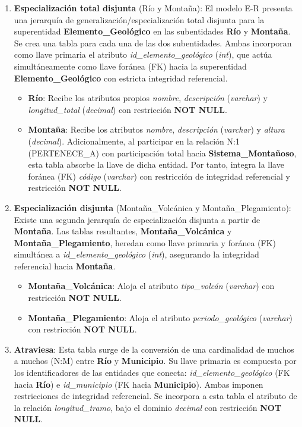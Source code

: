 \begin{enumerate}
\item \textbf{Especialización total disjunta} (Río y Montaña): El modelo E-R presenta una jerarquía de generalización/especialización total disjunta para la superentidad \textbf{Elemento\_Geológico} en las subentidades \textbf{Río} y \textbf{Montaña}. Se crea una tabla para cada una de las dos subentidades. Ambas incorporan como llave primaria el atributo \textit{id\_elemento\_geológico} (\textit{int}), que actúa simultáneamente como llave foránea (FK) hacia la superentidad \textbf{Elemento\_Geológico} con estricta integridad referencial.
\begin{itemize}
    \item \textbf{Río}: Recibe los atributos propios \textit{nombre}, \textit{descripción} (\textit{varchar}) y \textit{longitud\_total} (\textit{decimal}) con restricción \textbf{NOT NULL}.
    \item \textbf{Montaña}: Recibe los atributos \textit{nombre}, \textit{descripción} (\textit{varchar}) y \textit{altura} (\textit{decimal}). Adicionalmente, al participar en la relación N:1 (PERTENECE\_A) con participación total hacia \textbf{Sistema\_Montañoso}, esta tabla absorbe la llave de dicha entidad. Por tanto, integra la llave foránea (FK) \textit{código} (\textit{varchar}) con restricción de integridad referencial y restricción \textbf{NOT NULL}.
\end{itemize}

\item \textbf{Especialización disjunta} (Montaña\_Volcánica y Montaña\_Plegamiento): Existe una segunda jerarquía de especialización disjunta a partir de \textbf{Montaña}. Las tablas resultantes, \textbf{Montaña\_Volcánica} y \textbf{Montaña\_Plegamiento}, heredan como llave primaria y foránea (FK) simultánea a \textit{id\_elemento\_geológico} (\textit{int}), asegurando la integridad referencial hacia \textbf{Montaña}.
\begin{itemize}
    \item \textbf{Montaña\_Volcánica}: Aloja el atributo \textit{tipo\_volcán} (\textit{varchar}) con restricción \textbf{NOT NULL}.
    \item \textbf{Montaña\_Plegamiento}: Aloja el atributo \textit{periodo\_geológico} (\textit{varchar}) con restricción \textbf{NOT NULL}.
\end{itemize}

\item \textbf{Atraviesa}: Esta tabla surge de la conversión de una cardinalidad de muchos a muchos (N:M) entre \textbf{Río} y \textbf{Municipio}. Su llave primaria es compuesta por los identificadores de las entidades que conecta: \textit{id\_elemento\_geológico} (FK hacia \textbf{Río}) e \textit{id\_municipio} (FK hacia \textbf{Municipio}). Ambas imponen restricciones de integridad referencial. Se incorpora a esta tabla el atributo de la relación \textit{longitud\_tramo}, bajo el dominio \textit{decimal} con restricción \textbf{NOT NULL}.


\end{enumerate}

